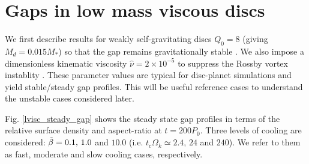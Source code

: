 \section{Gaps in low mass viscous discs}

We first describe results for weakly self-gravitating
discs $Q_0=8$ (giving $M_d=0.015M_*$) so that the gap remains 
gravitationally stable \citep{lin11b}. We also impose a dimensionless
kinematic viscosity $\hat{\nu}=2\times10^{-5}$ to suppress the Rossby
vortex instablity \citep{valborro07}. These parameter values
are typical for disc-planet simulations and yield stable/steady 
gap profiles. This will be useful reference cases to  
understand the unstable cases considered later.  

Fig. \ref{lvisc_steady_gap} shows the steady state gap profiles in terms of the relative
surface density and aspect-ratio at $t=200P_0$. Three levels of cooling are considered:
$\tilde{\beta}=0.1,\,1.0$ and $10.0$ (i.e. $t_c\Omega_k\simeq2.4,\,24$ and $240$). We refer to them as
fast, moderate and slow cooling cases, respectively. 











